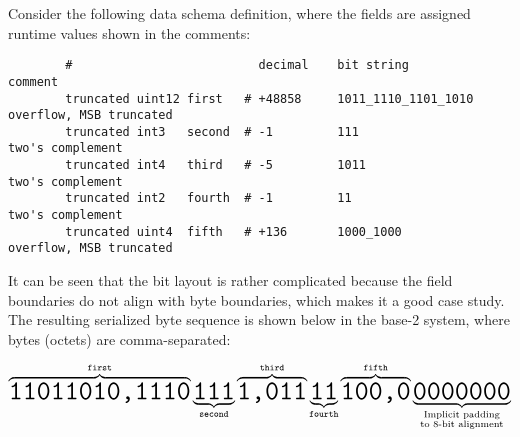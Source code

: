 \begin{remark}
    Consider the following data schema definition,
    where the fields are assigned runtime values shown in the comments:

    \begin{verbatim}
        #                          decimal    bit string            comment
        truncated uint12 first   # +48858     1011_1110_1101_1010   overflow, MSB truncated
        truncated int3   second  # -1         111                   two's complement
        truncated int4   third   # -5         1011                  two's complement
        truncated int2   fourth  # -1         11                    two's complement
        truncated uint4  fifth   # +136       1000_1000             overflow, MSB truncated
    \end{verbatim}

    It can be seen that the bit layout is rather complicated because the field boundaries do not align with byte
    boundaries, which makes it a good case study.
    The resulting serialized byte sequence is shown below in the base-2 system,
    where bytes (octets) are comma-separated:

    $$
        \overbrace{\hugett{11011010,1110}}^{\texttt{first}}%
        \underbrace{\hugett{111}}_{\texttt{second}}%
        \overbrace{\hugett{1,011}}^{\texttt{third}}%
        \underbrace{\hugett{11}}_{\texttt{fourth}}%
        \overbrace{\hugett{100,0}}^{\texttt{fifth}}%
        \underbrace{\hugett{0000000}}_{\substack{\text{Implicit padding} \\ \text{to 8-bit alignment}}}
    $$
\end{remark}
